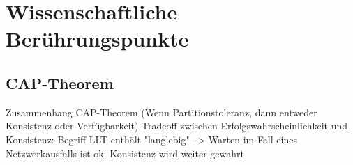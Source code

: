 \section{Wissenschaftliche Berührungspunkte}

\subsection{CAP-Theorem}


Zusammenhang CAP-Theorem (Wenn Partitionstoleranz, dann entweder Konsistenz oder Verfügbarkeit)
Tradeoff zwischen Erfolgswahrscheinlichkeit und Konsistenz: Begriff LLT enthält "langlebig" --> Warten im Fall eines Netzwerkausfalls ist ok. Konsistenz wird weiter gewahrt

